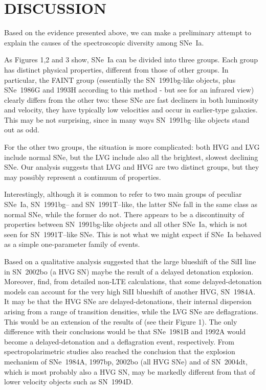 \documentclass[preprint2]{aastex}
\begin{document}
\section{DISCUSSION} \label{dis}

Based on the evidence presented above, we can make a preliminary attempt to 
explain the causes of the spectroscopic diversity among SNe~Ia. 

As Figures 1,2 and 3 show, SNe~Ia can be divided into three groups. 
Each group has distinct physical properties, different from those of 
other groups. In particular, the FAINT group (essentially the
SN~1991bg-like objects, plus SNe~1986G and 1993H according to this
method - but see \citet{mei00} for an infrared view) clearly differs
from the other two: these SNe are fast decliners in both luminosity
and velocity, they have typically low velocities and occur in
earlier-type galaxies. This may be not surprising, since in many ways
SN~1991bg--like objects stand out as odd.

For the other two groups, the situation is more complicated: both HVG and LVG
include normal SNe, but the LVG include also all the brightest, slowest 
declining SNe. Our analysis suggests that LVG and HVG are two distinct groups,
but they may possibly represent a continuum of properties. 

Interestingly, although it is common to refer to two main groups of peculiar
SNe~Ia, SN~1991bg-- and SN~1991T--like, the latter SNe fall in the same class
as  normal SNe, while the former do not.  There appears to be a discontinuity
of properties between SN~1991bg-like objects and all other SNe~Ia, which is not
seen for SN~1991T--like SNe. This is not what we might expect if SNe~Ia behaved
as a simple one-parameter family of events. 

Based on a qualitative analysis \citet{ben04} suggested that the large
blueshift of the SiII line in SN~2002bo (a HVG SN) maybe the result of
a delayed detonation explosion. Moreover, \cite{len00} find, from
detailed non-LTE calculations, that some delayed-detonation models can
account for the very high SiII blueshift of another HVG, SN~1984A. It
may be that the HVG SNe are delayed-detonations, their internal
dispersion arising from a range of transition densities, while the LVG
SNe are deflagrations. This would be an extension of the results of
\citet{hat00} (see their Figure 1).  The only difference with their
conclusions would be that SNe~1981B and 1992A would become a
delayed-detonation and a deflagration event, respectively. From
spectropolarimetric studies \citet{wan04} also reached the conclusion
that the explosion mechanism of SNe~1984A, 1997bp, 2002bo (all HVG SNe) 
and of SN~2004dt, which is most probably also a HVG SN, may be markedly 
different from that of lower velocity objects such as SN~1994D.
\end{document}
